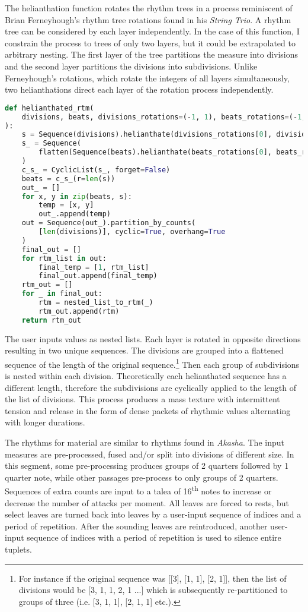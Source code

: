 The helianthation function rotates the rhythm trees in a process reminiscent of Brian Ferneyhough's rhythm tree rotations found in his \textit{String Trio}. A rhythm tree can be considered by each layer independently. In the case of this function, I constrain the process to trees of only two layers, but it could be extrapolated to arbitrary nesting. The first layer of the tree partitions the measure into divisions and the second layer partitions the divisions into subdivisions. Unlike Ferneyhough's rotations, which rotate the integers of all layers simultaneously, two helianthations direct each layer of the rotation process independently.

\begin{lstlisting}[language=Python,frame=tb,caption={RTM Helianthation Function},label=lst:rtm-helianthation]
def helianthated_rtm(
    divisions, beats, divisions_rotations=(-1, 1), beats_rotations=(-1, 1)
):
    s = Sequence(divisions).helianthate(divisions_rotations[0], divisions_rotations[1])
    s_ = Sequence(
        flatten(Sequence(beats).helianthate(beats_rotations[0], beats_rotations[1]))
    )
    c_s_ = CyclicList(s_, forget=False)
    beats = c_s_(r=len(s))
    out_ = []
    for x, y in zip(beats, s):
        temp = [x, y]
        out_.append(temp)
    out = Sequence(out_).partition_by_counts(
        [len(divisions)], cyclic=True, overhang=True
    )
    final_out = []
    for rtm_list in out:
        final_temp = [1, rtm_list]
        final_out.append(final_temp)
    rtm_out = []
    for _ in final_out:
        rtm = nested_list_to_rtm(_)
        rtm_out.append(rtm)
    return rtm_out
\end{lstlisting}

The user inputs values as nested lists. Each layer is rotated in opposite directions resulting in two unique sequences. The divisions are grouped into a flattened sequence of the length of the original sequence.\footnote{For instance if the original sequence was [[3], [1, 1], [2, 1]], then the list of divisions would be [3, 1, 1, 2, 1 ...] which is subsequently re-partitioned to groups of three (i.e. [3, 1, 1], [2, 1, 1] etc.).} Then each group of subdivisions is nested within each division. Theoretically each helianthated sequence has a different length, therefore the subdivisions are cyclically applied to the length of the list of divisions. This process produces a mass texture with intermittent tension and release in the form of dense packets of rhythmic values alternating with longer durations.

The rhythms for material  are similar to rhythms found in \textit{Akasha}. The input measures are pre-processed, fused and/or split into divisions of different size. In this segment, some pre-processing produces groups of 2 quarters followed by 1 quarter note, while other passages pre-process to only groups of 2 quarters. Sequences of extra counts are input to a talea of 16\textsuperscript{th} notes to increase or decrease the number of attacks per moment. All leaves are forced to rests, but select leaves are turned back into leaves by a user-input sequence of indices and a period of repetition. After the sounding leaves are reintroduced, another user-input sequence of indices with a period of repetition is used to silence entire tuplets.

